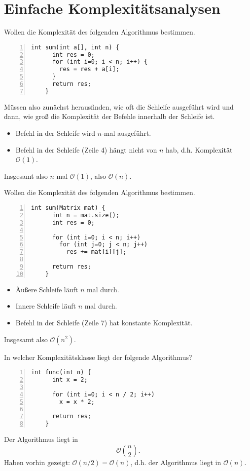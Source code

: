 \documentclass[aspectratio=169,handout]{beamer}
\begin{document}
\section{Einfache Komplexitätsanalysen}
\begin{frame}[fragile]
  Wollen die Komplexität des folgenden Algorithmus bestimmen.
  \begin{lstlisting}[numbers=left]
    int sum(int a[], int n) {
      int res = 0;      
      for (int i=0; i < n; i++) {
        res = res + a[i];
      }
      return res;
    }
  \end{lstlisting}
  \pause
  Müssen also zunächst herausfinden, wie oft die Schleife ausgeführt wird und dann, wie groß die Komplexität der Befehle innerhalb der Schleife ist.
  \pause
  \begin{itemize}
  \item Befehl in der Schleife wird $n$-mal ausgeführt.
  \pause
  \item Befehl in der Schleife (Zeile 4) hängt nicht von $n$ hab, d.h. Komplexität $\mathcal{O}(1)$.
  \end{itemize}
  \pause
  Insgesamt also $n$ mal $\mathcal{O}(1)$, also $\mathcal{O}(n)$.
\end{frame}

\begin{frame}[fragile]
  Wollen die Komplexität des folgenden Algorithmus bestimmen.
  \begin{lstlisting}[numbers=left]
    int sum(Matrix mat) {
      int n = mat.size();
      int res = 0;
      
      for (int i=0; i < n; i++)
        for (int j=0; j < n; j++)
          res += mat[i][j];
      
      return res;
    }
  \end{lstlisting}
  \pause
  \begin{itemize}
  \item Äußere Schleife läuft $n$ mal durch.
  \pause
  \item Innere Schleife läuft $n$ mal durch.
  \pause
  \item Befehl in der Schleife (Zeile 7) hat konstante Komplexität.
  \end{itemize}
  \pause
  Insgesamt also $\mathcal{O}(n^2)$.
\end{frame}

\begin{frame}[fragile]
  In welcher Komplexitätsklasse liegt der folgende Algorithmus?
  \begin{lstlisting}[numbers=left]
    int func(int n) {
      int x = 2;
      
      for (int i=0; i < n / 2; i++)
        x = x * 2;
      
      return res;
    }
  \end{lstlisting}
  \pause
  Der Algorithmus liegt in
  \[
    \mathcal{O}(\frac{n}{2}).
  \]
  \pause
  Haben vorhin gezeigt:
  $\mathcal{O}(n/2) = \mathcal{O}(n)$, d.h. der Algorithmus liegt in $\mathcal{O}(n)$.
\end{frame}
\end{document}

